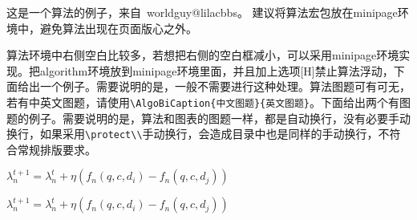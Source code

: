 
这是一个算法的例子，来自~worldguy@lilacbbs。
建议将算法宏包放在minipage环境中，避免算法出现在页面版心之外。

%

算法环境中右侧空白比较多，若想把右侧的空白框减小，可以采用minipage环境实现。把algorithm环境放到minipage环境里面，并且加上选项[H]禁止算法浮动，下面给出一个例子。需要说明的是，一般不需要进行这种处理。算法图题可有可无，若有中英文图题，请使用\verb|\AlgoBiCaption{中文图题}{英文图题}|。下面给出两个有图题的例子。需要说明的是，算法和图表的图题一样，都是自动换行，没有必要手动换行，如果采用\verb|\protect\\|手动换行，会造成目录中也是同样的手动换行，不符合常规排版要求。

\begin{minipage}{0.8\textwidth}\centering
\begin{algorithm}[H]
  { $\lambda^{t+1}_n = \lambda^t_n +
    \eta (f_n(q, c, d_i) - f_n(q, c, d_j))$ }
\end{algorithm}
\end{minipage}


\begin{minipage}{0.9\textwidth}\centering
\begin{algorithm}[H]
  { $\lambda^{t+1}_n = \lambda^t_n +
    \eta (f_n(q, c, d_i) - f_n(q, c, d_j))$ }
\end{algorithm}
\end{minipage}

\label{Tricks:Equations}

